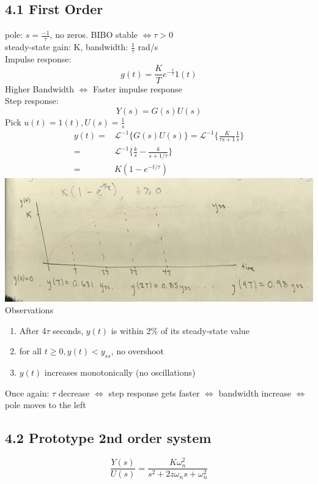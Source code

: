 \documentclass[letterpaper]{article}
\begin{document}
	\subsection*{4.1 First Order}
	pole: $s=\frac{-1}{\tau}$, no zeros. BIBO stable $\iff \tau >0$\\
	steady-state gain: K, bandwidth: $\frac{1}{\tau}$ rad/s\\
	Impulse response: $$g(t)=\frac{K}{T}e^{-\frac{t}{\tau}}1(t)$$
	Higher Bandwidth $\iff$ Faster impulse response\\
		
		
	Step response:\\
	$$Y(s)=G(s)U(s)$$
	Pick $u(t)=1(t),U(s)=\frac{1}{s}$
	\begin{align*}
		y(t)= & \mathscr{L}^{-1}\{G(s)U(s)\}=\mathscr{L}^{-1}\{\frac{K}{\tau s +1}\frac{1}{s}\} \\
		=     & \mathscr{L}^{-1}\{\frac{k}{s}-\frac{k}{s+1/\tau}\}                              \\
		=     & K(1-e^{-t/\tau})                                                                
	\end{align*}
	\includegraphics[scale=0.1]{images/4_2_STOP_RESPONSE.jpg}\\
	Observations
	\begin{enumerate}
		\item After 4$\tau$ seconds, $y(t)$ is within 2\% of its steady-state value
		\item for all $t\geq 0,y(t)<y_{ss}$, no overshoot
		\item $y(t)$ increases monotonically (no oscillations)
	\end{enumerate}
	Once again: $\tau$ decrease $\iff$ step response gets faster $\iff$ bandwidth increase $\iff$ pole moves to the left
	\subsection*{4.2 Prototype 2nd order system}
	$$\frac{Y(s)}{U(s)}=\frac{K\omega_n^2}{s^2+2z\omega_n s+\omega_n^2}$$
\end{document}
